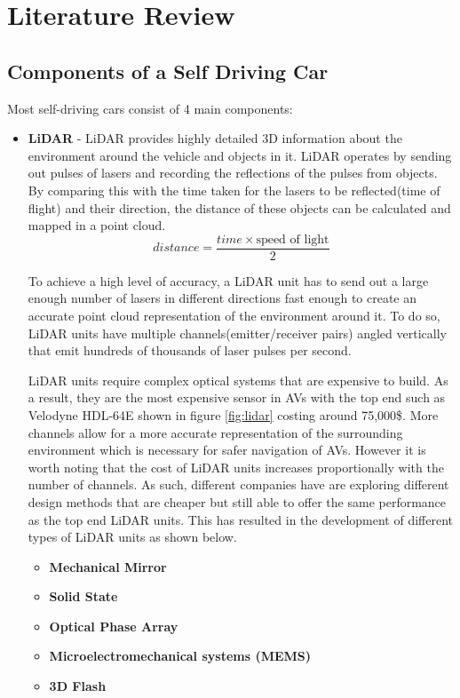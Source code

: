 \let\textcircled=\pgftextcircled


\chapter{Literature Review}
\label{chap:lit_review}


\section{Components of a Self Driving Car}

Most self-driving cars consist of 4 main components: 
\begin{itemize}
	\item \textbf{LiDAR} - LiDAR provides highly detailed 3D information about the environment around the vehicle and objects in it. LiDAR operates by sending out pulses of lasers and recording the reflections of the pulses from objects. By comparing this with the time taken for the lasers to be reflected(time of flight) and their direction, the distance of these objects can be calculated and mapped in a point cloud. 
	\begin{equation*}
	distance = \frac{time \times \text{speed of light}}{2}
	\end{equation*}
	
	To achieve a high level of accuracy, a LiDAR unit has to send out a large enough number of lasers in different directions fast enough to create an accurate point cloud representation of the environment around it. To do so,  LiDAR units have multiple channels(emitter/receiver pairs) angled vertically that  emit hundreds of thousands of laser pulses  per second.
	
	LiDAR units require complex optical systems that are expensive to build. As a result,  they are the most expensive sensor in AVs with the top end such as Velodyne HDL-64E shown in figure \ref{fig:lidar} costing around 75,000\$. More channels allow for a more accurate representation of the surrounding environment which is necessary for safer navigation of AVs. However it is worth noting that the cost of LiDAR units increases proportionally with the number of channels. 
	As such, different companies have are exploring different design methods that are cheaper but still able to offer the same performance as the top end LiDAR units. 
	This has resulted in the development of different types of LiDAR units as shown below. 
	\begin{itemize}
		\item \textbf{Mechanical Mirror}
		\item \textbf{Solid State}
		\item \textbf{Optical Phase Array}
		\item \textbf{Microelectromechanical systems (MEMS)}
		\item \textbf{3D Flash}
	\end{itemize}


\end{itemize}
